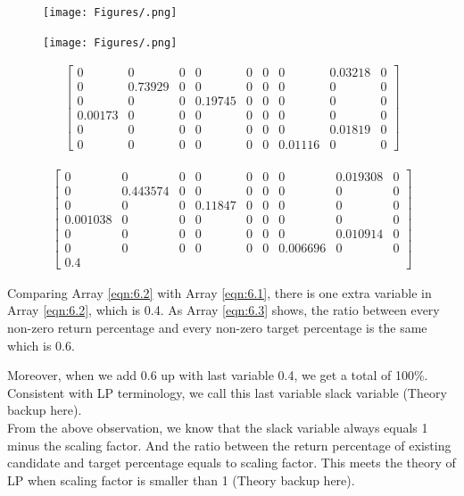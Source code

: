 \begin{figure}[!ht] 
\centering
\texttt{[image: Figures/.png]}
\caption{} \label{fig:6.2}
\end{figure}


\begin{figure}[!ht] 
\centering
\texttt{[image: Figures/.png]}
\caption{} \label{fig:6.3}
\end{figure}

\begin{eqnarray}\label{eqn:6.1}
\begin {bmatrix}
0& 0& 0& 0& 0& 0& 0& 0.03218& 0 \\
0& 0.73929& 0& 0& 0& 0& 0& 0& 0 \\
0& 0& 0& 0.19745& 0& 0& 0& 0& 0 \\
0.00173& 0& 0& 0& 0& 0& 0& 0& 0 \\
0& 0& 0& 0& 0& 0& 0& 0.01819& 0 \\ 
0& 0& 0& 0& 0& 0& 0.01116& 0& 0
\end {bmatrix}
\end{eqnarray}

\begin{eqnarray}\label{eqn:6.2}
\begin {bmatrix}
0& 0& 0& 0& 0& 0& 0& 0.019308& 0 \\
0& 0.443574& 0& 0& 0& 0& 0& 0& 0 \\
0& 0& 0& 0.11847& 0& 0& 0& 0& 0  \\
0.001038& 0& 0& 0& 0& 0& 0& 0& 0 \\ 
0& 0& 0& 0& 0& 0& 0& 0.010914& 0 \\
0& 0& 0& 0& 0& 0& 0.006696& 0& 0 \\
0.4
\end {bmatrix}
\end{eqnarray}

Comparing Array \ref{eqn:6.2} with Array \ref{eqn:6.1}, there is one extra variable in Array \ref{eqn:6.2}, which is 0.4. As Array \ref{eqn:6.3} shows, the ratio between every non-zero return percentage and every non-zero target percentage is the same which is 0.6.

Moreover, when we add 0.6 up with last variable 0.4, we get a total of 100\%. Consistent with LP terminology, we call this last variable slack variable (Theory backup here).\\

From the above observation, we know that the slack variable always equals 1 minus the scaling factor. And the ratio between the return percentage of existing candidate and target percentage equals to scaling factor. This meets the theory of LP when scaling factor is smaller than 1 (Theory backup here). \\

